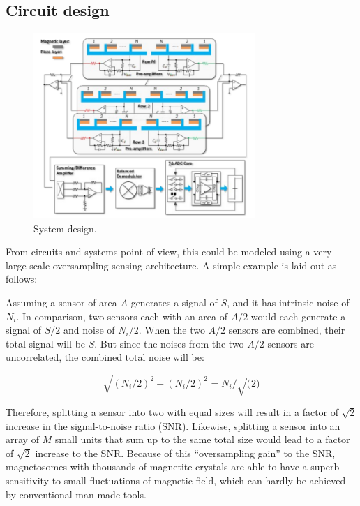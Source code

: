 \subsection{Circuit design}
 
\begin{figure}
\centering
\includegraphics[width=0.75\textwidth]{system}
\caption{System design.}
\label{fig:system}
\end{figure}

From circuits and systems point of view, this could be modeled using a very-large-scale oversampling sensing architecture. A simple example is laid out as follows: 

Assuming a sensor of area $A$ generates a signal of $S$, and it has intrinsic noise of $N_i$. In comparison, two sensors each with an area of $A/2$ would each generate a signal of $S/2$ and noise of $N_i/2$. When the two $A/2$ sensors are combined, their total signal will be $S$. But since the noises from the two $A/2$ sensors are uncorrelated, the combined total noise will be:

$$\sqrt{(N_i/2)^2+(N_i/2)^2} = N_i/\sqrt(2) $$

Therefore, splitting a sensor into two with equal sizes will result in a factor of $\sqrt{2}$ increase in the signal-to-noise ratio (SNR). Likewise, splitting a sensor into an array of $M$ small units that sum up to the same total size would lead to a factor of $\sqrt{2}$ increase to the SNR. Because of this “oversampling gain” to the SNR, magnetosomes with thousands of magnetite crystals are able to have a superb sensitivity to small fluctuations of magnetic field, which can hardly be achieved by conventional man-made tools. 

